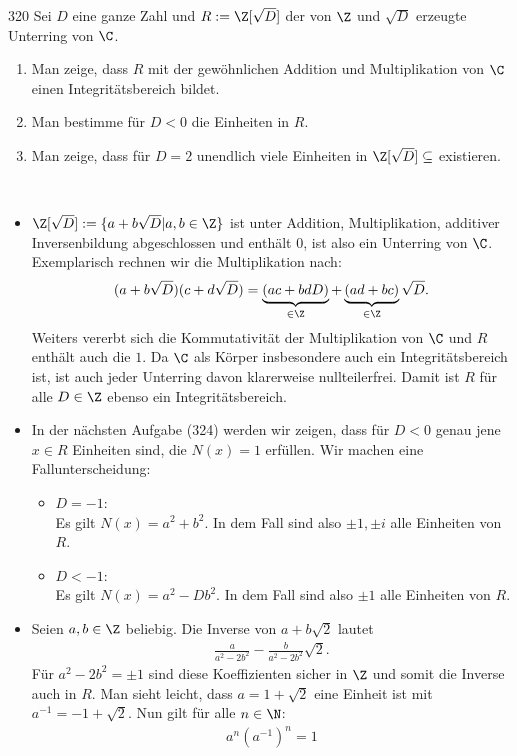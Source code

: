 \begin{algebraUE}{320}
Sei $D$ eine ganze Zahl und $R := \Z[\sqrt{D}]$ der von $\Z$ und $\sqrt{D}$
erzeugte Unterring von $\C$.
\begin{enumerate}
  \item Man zeige, dass $R$ mit der gewöhnlichen Addition und Multiplikation von $\C$
  einen Integritätsbereich bildet.
  \item Man bestimme für $D < 0$ die Einheiten in $R$.
  \item Man zeige, dass für $D = 2$ unendlich viele Einheiten in $\Z[\sqrt{D}] \subseteq $
  existieren.
\end{enumerate}
\end{algebraUE}
\begin{solution}
\leavevmode \\
\begin{itemize}
  \item $\Z[\sqrt{D}] := \{a + b\sqrt{D} | a,b \in \Z\}$ ist unter Addition, Multiplikation,
  additiver Inversenbildung abgeschlossen und enthält $0$, ist also ein Unterring von $\C$.
  Exemplarisch rechnen wir die Multiplikation nach:
  \begin{align*}
    (a + b\sqrt{D})(c + d\sqrt{D}) = \underbrace{(ac + bdD)}_{\in \Z} + \underbrace{(ad + bc)}_{\in \Z}\sqrt{D}.
  \end{align*}
  Weiters vererbt sich die Kommutativität der Multiplikation von $\C$ und $R$
  enthält auch die $1$.
  Da $\C$ als Körper insbesondere auch ein Integritätsbereich ist, ist auch
  jeder Unterring davon klarerweise nullteilerfrei. Damit ist $R$ für alle $D \in \Z$
  ebenso ein Integritätsbereich.
  \item
  In der nächsten Aufgabe (324) werden wir zeigen, dass für $D < 0$ genau jene $x \in R$ Einheiten sind, die $N(x) = 1$ erfüllen.
  Wir machen eine Fallunterscheidung:
  \begin{itemize}
    \item $D = -1$: \\
    Es gilt $N(x) = a^2 + b^2$. In dem Fall sind also $\pm1,\pm i$ alle Einheiten von $R$.
    \item $D < -1$: \\
    Es gilt $N(x) = a^2 - D b^2$. In dem Fall sind also $\pm1$ alle Einheiten von $R$.
  \end{itemize}
  \item
  Seien $a,b \in \Z$ beliebig. Die Inverse von $a + b\sqrt{2}$ lautet
  \begin{align*}
    \frac{a}{a^2 - 2b^2} - \frac{b}{a^2-2b^2}\sqrt{2}.
  \end{align*}
  Für $a^2 - 2b^2 = \pm 1$ sind diese Koeffizienten sicher in $\Z$ und somit die Inverse
  auch in $R$.
  Man sieht leicht, dass $a = 1 + \sqrt{2}$ eine Einheit ist mit $a^{-1} = -1 + \sqrt{2}$. Nun gilt für alle $n \in \N$:
  \begin{align*}
    a^n {(a^{-1})}^n = 1
  \end{align*}


\end{itemize}
\end{solution}
